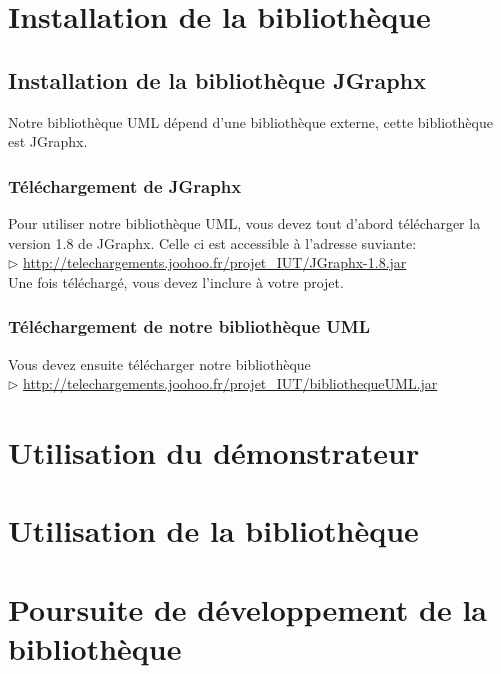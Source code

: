 \documentclass[12pt,a4paper,openany]{report}
\begin{document}
	\maketitle
	\newpage
	\tableofcontents
	\newpage
	\chapter{Installation de la bibliothèque}
	\section{Installation de la bibliothèque JGraphx}
	Notre bibliothèque UML dépend d'une bibliothèque externe, cette bibliothèque est JGraphx.
	\subsection{Téléchargement de JGraphx}
	Pour utiliser notre bibliothèque UML, vous devez tout d'abord télécharger la version 1.8 de JGraphx. Celle ci est accessible à l'adresse suviante:\\
	$\rhd$ \url{http://telechargements.joohoo.fr/projet\_IUT/JGraphx-1.8.jar}\\
	Une fois téléchargé, vous devez l'inclure à votre projet.
	\subsection{Téléchargement de notre bibliothèque UML}
	Vous devez ensuite télécharger notre bibliothèque\\
	$\rhd$ \url{http://telechargements.joohoo.fr/projet\_IUT/bibliothequeUML.jar}\\

	\chapter{Utilisation du démonstrateur}
	\chapter{Utilisation de la bibliothèque}
	\chapter{Poursuite de développement de la bibliothèque}				
\end{document}
